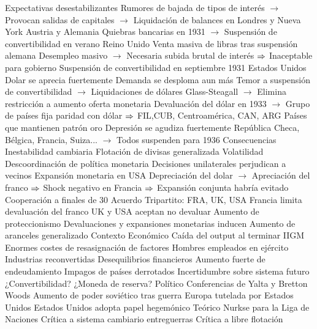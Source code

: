 \documentclass{nuevotema}
\begin{document}
\begin{esquemal}
				\4 Expectativas desestabilizantes
				\4[] Rumores de bajada de tipos de interés
				\4[] $\to$ Provocan salidas de capitales
				\4[] $\to$ Liquidación de balances en Londres y Nueva York
				\4 Austria y Alemania
				\4[] Quiebras bancarias en 1931
				\4[] $\to$ Suspensión de convertibilidad en verano
				\4 Reino Unido
				\4[] Venta masiva de libras tras suspensión alemana
				\4[] Desempleo masivo
				\4[] $\to$ Necesaria subida brutal de interés
				\4[] $\Rightarrow$ Inaceptable para gobierno
				\4[] Suspensión de convertibilidad en septiembre 1931
				\4 Estados Unidos
				\4[] Dolar se aprecia fuertemente
				\4[] Demanda se desploma aun más
				\4[] Temor a suspensión de convertibilidad
				\4[] $\to$ Liquidaciones de dólares
				\4[] Glass-Steagall
				\4[] $\to$ Elimina restricción a aumento oferta monetaria
				\4[] Devaluación del dólar en 1933
				\4[] $\to$ Grupo de países fija paridad con dólar
				\4[] $\Rightarrow$ FIL,CUB, Centroamérica, CAN, ARG
				\4 Países que mantienen patrón oro
				\4[] Depresión se agudiza fuertemente
				\4[] República Checa, Bélgica, Francia, Suiza...
				\4[] $\to$ Todos suspenden para 1936
		\2 Consecuencias
			\3 Inestabilidad cambiaria
				\4 Flotación de divisas generalizada
				\4 Volatilidad
			\3 Descoordinación de política monetaria
				\4 Decisiones unilaterales perjudican a vecinos
				\4 Expansión monetaria en USA
				\4[] Depreciación del dolar
				\4[] $\to$ Apreciación del franco
				\4[] $\Rightarrow$ Shock negativo en Francia
				\4[] $\Rightarrow$ Expansión conjunta habría evitado
			\3 Cooperación a finales de 30
				\4 Acuerdo Tripartito: FRA, UK, USA
				\4[] Francia limita devaluación del franco
				\4[] UK y USA aceptan no devaluar
			\3 Aumento de proteccionismo
				\4 Devaluaciones y expansiones monetarias inducen
				\4 Aumento de aranceles generalizado
	\1 
		\2 Contexto
			\3 Económico
				\4 Caída del output al terminar IIGM
				\4 Enormes costes de resasignación de factores
				\4[] Hombres empleados en ejército
				\4[] Industrias reconvertidas
				\4 Desequilibrios financieros
				\4[] Aumento fuerte de endeudamiento
				\4[] Impagos de países derrotados
				\4 Incertidumbre sobre sistema futuro
				\4[] ¿Convertibilidad?
				\4[] ¿Moneda de reserva?
			\3 Político
				\4 Conferencias de Yalta y Bretton Woods
				\4 Aumento de poder soviético tras guerra
				\4 Europa tutelada por Estados Unidos
				\4 Estados Unidos adopta papel hegemónico
			\3 Teórico
				\4 Nurkse para la Liga de Naciones
				\4[] Crítica a sistema cambiario entreguerras
				\4[] Crítica a libre flotación

\end{esquemal}
\end{document}
